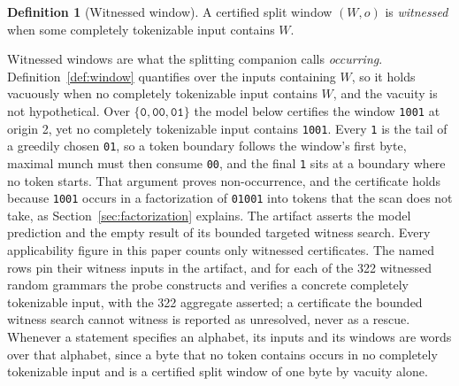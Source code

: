 \documentclass[11pt,a4paper]{article}
\theoremstyle{definition}
\newtheorem{definition}{Definition}
\theoremstyle{plain}
\newcommand{\code}[1]{\texttt{#1}}
\begin{document}
\begin{definition}[Witnessed window]
\label{def:witnessed}
A certified split window $(W, o)$ is \emph{witnessed} when some completely tokenizable input contains $W$.
\end{definition}

Witnessed windows are what the splitting companion calls \emph{occurring}. Definition~\ref{def:window} quantifies over
the inputs containing $W$, so it holds vacuously when no completely tokenizable input contains $W$, and the vacuity is
not hypothetical. Over $\{\code{0}, \code{00}, \code{01}\}$ the model below certifies the window \code{1001} at origin
2, yet no completely tokenizable input contains \code{1001}. Every \code{1} is the tail of a greedily chosen \code{01},
so a token boundary follows the window's first byte, maximal munch must then consume \code{00}, and the final \code{1}
sits at a boundary where no token starts. That argument proves non-occurrence, and the certificate holds because
\code{1001} occurs in a factorization of \code{01001} into tokens that the scan does not take, as
Section~\ref{sec:factorization} explains. The artifact asserts the model prediction and the empty result of its bounded
targeted witness search. Every applicability figure in this paper counts only witnessed certificates. The named rows pin
their witness inputs in the artifact, and for each of the 322 witnessed random grammars the probe constructs and
verifies a concrete completely tokenizable input, with the 322 aggregate asserted; a certificate the bounded witness
search cannot witness is reported as unresolved, never as a rescue. Whenever a statement specifies an alphabet, its
inputs and its windows are words over that alphabet, since a byte that no token contains occurs in no completely
tokenizable input and is a certified split window of one byte by vacuity alone.
\end{document}
